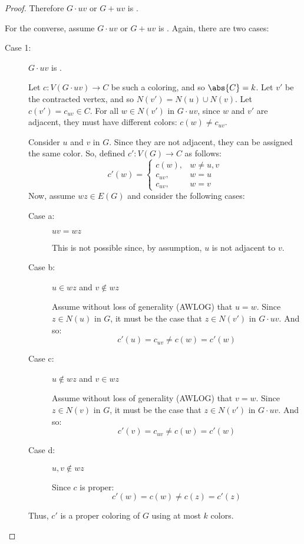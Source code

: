 \begin{proof}
  Therefore \(G\cdot uv\) or \(G+uv\) is .
    
  For the converse, assume \(G\cdot uv\) or \(G+uv\) is .  Again, there are two cases:
  \begin{description}
  \item [Case 1:] \(G\cdot uv\) is .

    Let \(c:V(G\cdot uv)\to C\) be such a coloring, and so \(\abs{C}=k\).  Let \(v'\) be the contracted vertex, and
    so \(N(v')=N(u)\cup N(v)\).  Let \(c(v')=c_{uv}\in C\).  For all \(w\in N(v')\) in \(G\cdot uv\), since \(w\) and
    \(v'\) are adjacent, they must have different colors: \(c(w)\ne c_{uv}\).

    Consider \(u\) and \(v\) in \(G\).  Since they are not adjacent, they can be assigned the same color.  So,
    defined \(c':V(G)\to C\) as follows:
    \[c'(w)=\begin{cases}
    c(w), & w\ne u,v \\
    c_{uv}, & w=u \\
    c_{uv}, & w=v
    \end{cases}\]
    Now, assume \(wz\in E(G)\) and consider the following cases:
    \begin{description}
    \item[Case a:] \(uv=wz\)

      This is not possible since, by assumption, \(u\) is not adjacent to \(v\).

    \item[Case b:] \(u\in wz\) and \(v\notin wz\)

      Assume without loss of generality (AWLOG) that \(u=w\).  Since \(z\in N(u)\) in \(G\), it must be the case that
      \(z\in N(v')\) in \(G\cdot uv\).  And so:
      \[c'(u)=c_{uv}\ne c(w)=c'(w)\]

    \item[Case c:] \(u\notin wz\) and \(v\in wz\)

      Assume without loss of generality (AWLOG) that \(v=w\).  Since \(z\in N(v)\) in \(G\), it must be the case that
      \(z\in N(v')\) in \(G\cdot uv\).  And so:
      \[c'(v)=c_{uv}\ne c(w)=c'(w)\]

    \item[Case d:] \(u,v\notin wz\)

      Since \(c\) is proper:
      \[c'(w)=c(w)\ne c(z)=c'(z)\]
    \end{description}

    Thus, \(c'\) is a proper coloring of \(G\) using at most \(k\) colors.


\end{description}
\end{proof}
